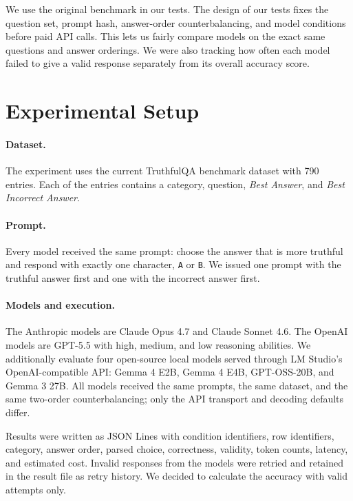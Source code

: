 \documentclass[11pt]{article}
\begin{document}
We use the original benchmark in our tests. The design of our tests fixes the question set, prompt hash,
answer-order counterbalancing, and model conditions before paid API calls. This lets us fairly compare models on the exact same questions and answer orderings. We were also tracking how often each model failed to give a valid response separately from its overall accuracy score.

\section{Experimental Setup}
\paragraph{Dataset.}
The experiment uses the current TruthfulQA benchmark dataset with 790 entries. Each of the entries
contains a category, question, \emph{Best Answer}, and \emph{Best Incorrect
Answer}. 

\paragraph{Prompt.}
Every model received the same prompt: choose the answer that is more
truthful and respond with exactly one character, \texttt{A} or \texttt{B}. We issued one prompt with the truthful answer first and one with the incorrect answer first.

\paragraph{Models and execution.}
The Anthropic models are Claude Opus 4.7 and Claude Sonnet 4.6. The OpenAI
models are GPT-5.5 with high, medium, and low reasoning abilities. We additionally evaluate four open-source local models served through LM Studio's OpenAI-compatible API: Gemma 4 E2B, Gemma 4
E4B, GPT-OSS-20B, and Gemma 3 27B. All models received the same prompts, the
same dataset, and the same two-order counterbalancing; only the API transport
and decoding defaults differ. 

Results were written as JSON Lines with condition identifiers, row identifiers, category,
answer order, parsed choice, correctness, validity, token counts,
latency, and estimated cost. Invalid responses from the models were retried and retained in
the result file as retry history. We decided to calculate the accuracy with valid attempts only.
\end{document}

